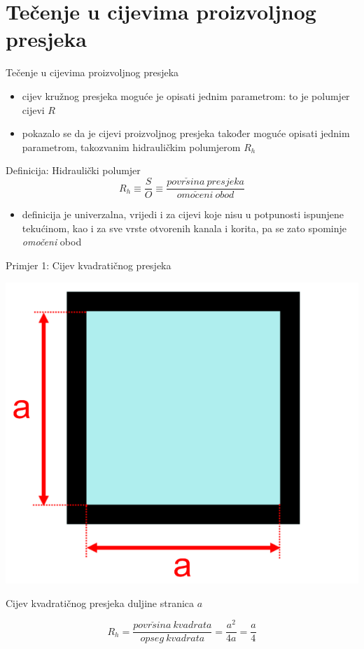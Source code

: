 \documentclass{beamer}
\begin{document}
\section{Tečenje u cijevima proizvoljnog presjeka}
\begin{frame}{Tečenje u cijevima proizvoljnog presjeka}

\begin{itemize}
\item cijev kružnog presjeka moguće je opisati jednim parametrom: to je
polumjer cijevi $R$
\item pokazalo se da je cijevi proizvoljnog presjeka također moguće opisati
jednim parametrom, takozvanim hidrauličkim polumjerom $R_{h}$
\end{itemize}
\begin{alertblock}{Definicija: Hidraulički polumjer}
\[
R_{h}\equiv\frac{S}{O}\equiv\frac{povr\check{s}ina\:presjeka}{omo\check{c}eni\:obod}
\]
\end{alertblock}
\begin{itemize}
\item definicija je univerzalna, vrijedi i za cijevi koje nisu u potpunosti
ispunjene tekućinom, kao i za sve vrste otvorenih kanala i korita,
pa se zato spominje\emph{ omočeni} obod
\end{itemize}
\end{frame}

\begin{frame}{Primjer 1: Cijev kvadratičnog presjeka}

\begin{center}
\includegraphics[width=0.3\paperwidth]{slike/slika3.PNG}
\par\end{center}
\begin{example}
{Cijev kvadratičnog presjeka duljine stranica $a$}

\[
R_{h}=\frac{povr\check{s}ina\:kvadrata}{opseg\:kvadrata}=\frac{a^{2}}{4a}=\frac{a}{4}
\]

\end{example}

\end{frame}
\end{document}
